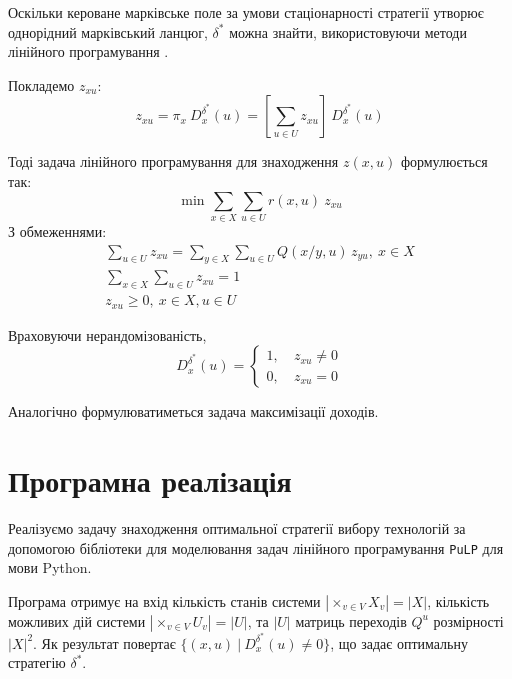 \documentclass[oneside,14pt]{extarticle}
\begin{document}
Оскільки кероване марківське поле за умови стаціонарності стратегії утворює однорідний марківський ланцюг, \(\delta^*\) можна знайти, використовуючи методи лінійного програмування \cite{Knopov:1998}.

Покладемо \(z_{xu}\):
\[z_{xu} = \pi_x\ D_x^{\delta^*}(u) = \left[\sum_{u \in U} z_{xu}\right]\ D_x^{\delta^*}(u)\]

Тоді задача лінійного програмування для знаходження \(z(x, u)\) формулюється так:
\[\min \sum_{x \in X} \sum_{u \in U} r(x, u)\ z_{xu}\]
З обмеженнями:
\begin{gather*}
\sum_{u \in U} z_{xu} = \sum_{y \in X} \sum_{u \in U} Q(x/y, u)\,z_{yu},\ x \in X \\
\sum_{x \in X} \sum_{u \in U} z_{xu} = 1 \\
z_{xu} \geq 0,\ x \in X, u \in U
\end{gather*}

Враховуючи нерандомізованість, 
\[D_x^{\delta^*}(u) = \begin{cases}
1,&\ z_{xu} \neq 0 \\
0,&\ z_{xu} = 0
\end{cases}\]

Аналогічно формулюватиметься задача максимізації доходів.











\section{Програмна реалізація}

Реалізуємо задачу знаходження оптимальної стратегії вибору технологій за допомогою бібліотеки для моделювання задач лінійного програмування \texttt{PuLP}\cite{PuLP} для мови Python.

Програма отримує на вхід кількість станів системи \(|\times_{v \in V} X_v| = |X|\), кількість можливих дій системи \(|\times_{v \in V}U_v| = |U|\), та \(|U|\) матриць переходів \(Q^u\) розмірності \(|X|^2\). Як результат повертає \(\{(x, u)\ |\ D_x^{\delta^*}(u) \neq 0\}\), що задає оптимальну стратегію \(\delta^*\).
\end{document}
